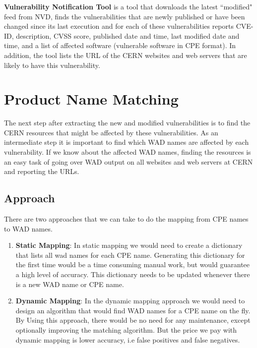 \begin{framed}
\textbf{Vulnerability Notification Tool} is a tool that downloads the latest ``modified" feed from NVD, finds the vulnerabilities that are newly published or have been changed since its last execution and for each of these vulnerabilities reports CVE-ID, description, CVSS score, published date and time, last modified date and time, and a list of affected software (vulnerable software in CPE format). In addition, the tool lists the URL of the CERN websites and web servers that are likely to have this vulnerability.
\end{framed} 


\section{Product Name Matching}

The next step after extracting the new and modified vulnerabilities is to find the CERN resources that might be affected by these vulnerabilities. As an intermediate step it is important to find which WAD names are affected by each vulnerability. If we know about the affected WAD names, finding the resources is an easy task of going over WAD output on all websites and web servers at CERN and reporting the URLs. 


\subsection{Approach}

There are two approaches that we can take to do the mapping from CPE names to WAD names.
\begin{enumerate}
\item \textbf{Static Mapping}: In static mapping we would need to create a dictionary that lists all wad names for each CPE name. Generating this dictionary for the first time would be a time consuming manual work, but would guarantee a high level of accuracy. This dictionary needs to be updated whenever there is a new WAD name or CPE name. 
\item \textbf{Dynamic Mapping}: In the dynamic mapping approach we would need to design an algorithm that would find WAD names for a CPE name on the fly. By Using this approach, there would be no need for any maintenance, except optionally improving the matching algorithm. But the price we pay with dynamic mapping is lower accuracy, i.e false positives and false negatives.  
\end{enumerate} 


